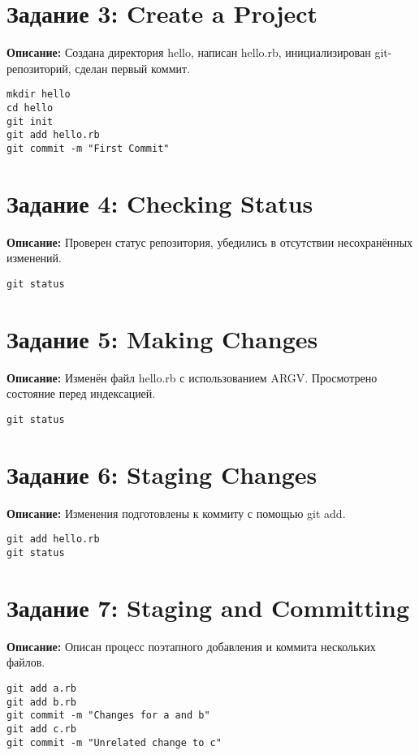 \documentclass[a4paper,12pt]{report}
\begin{document}
\section*{Задание 3: Create a Project}
\textbf{Описание:} Создана директория hello, написан hello.rb, инициализирован git-репозиторий, сделан первый коммит.
\begin{verbatim}
mkdir hello
cd hello
git init
git add hello.rb
git commit -m "First Commit"
\end{verbatim}

\section*{Задание 4: Checking Status}
\textbf{Описание:} Проверен статус репозитория, убедились в отсутствии несохранённых изменений.
\begin{verbatim}
git status
\end{verbatim}

\section*{Задание 5: Making Changes}
\textbf{Описание:} Изменён файл hello.rb с использованием ARGV. Просмотрено состояние перед индексацией.
\begin{verbatim}
git status
\end{verbatim}

\section*{Задание 6: Staging Changes}
\textbf{Описание:} Изменения подготовлены к коммиту с помощью git add.
\begin{verbatim}
git add hello.rb
git status
\end{verbatim}

\section*{Задание 7: Staging and Committing}


\textbf{Описание:} Описан процесс поэтапного добавления и коммита нескольких файлов.
\begin{verbatim}
git add a.rb
git add b.rb
git commit -m "Changes for a and b"
git add c.rb
git commit -m "Unrelated change to c"
\end{verbatim}
\end{document}
